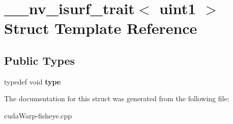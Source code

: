 \hypertarget{struct____nv__isurf__trait_3_01uint1_01_4}{}\section{\+\_\+\+\_\+nv\+\_\+isurf\+\_\+trait$<$ uint1 $>$ Struct Template Reference}
\label{struct____nv__isurf__trait_3_01uint1_01_4}
\subsection*{Public Types}
\begin{DoxyCompactItemize}
\item 
typedef void {\bfseries type}\hypertarget{struct____nv__isurf__trait_3_01uint1_01_4_ad347881ce25945d920bd1be6284162f7}{}\label{struct____nv__isurf__trait_3_01uint1_01_4_ad347881ce25945d920bd1be6284162f7}

\end{DoxyCompactItemize}


The documentation for this struct was generated from the following file\+:\begin{DoxyCompactItemize}
\item 
cuda\+Warp-\/fisheye.\+cpp\end{DoxyCompactItemize}
